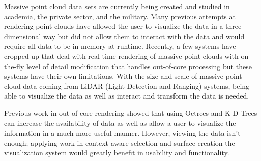 \begin{abstractpage}
Massive point cloud data sets are currently being created and studied in
academia, the private sector, and the military. Many previous attempts at
rendering point clouds have allowed the user to visualize the data in a
three-dimensional way but did not allow them to interact with the data and would
require all data to be in memory at runtime. Recently, a few systems have
cropped up that deal with real-time rendering of massive point clouds with
on-the-fly level of detail modification that handles out-of-core processing but
these systems have their own limitations. With the size and scale of massive
point cloud data coming from LiDAR (Light Detection and Ranging) systems, being
able to visualize the data as well as interact and transform the data is needed.

Previous work in out-of-core rendering
\cite{3_wenzel2014out,4_goswami_zhang_pajarola_gobbetti_2010,5_richter_2010}
showed that using Octrees and K-D Trees can increase the availability of data as
well as allow a user to visualize the information in a much more useful manner.
However, viewing the data isn't enough; applying work in context-aware selection
\cite{2_yu:hal-01178051} and surface creation \cite{1_VAST:VAST11:105-112} the
visualization system would greatly benefit in usability and functionality.
\end{abstractpage}
